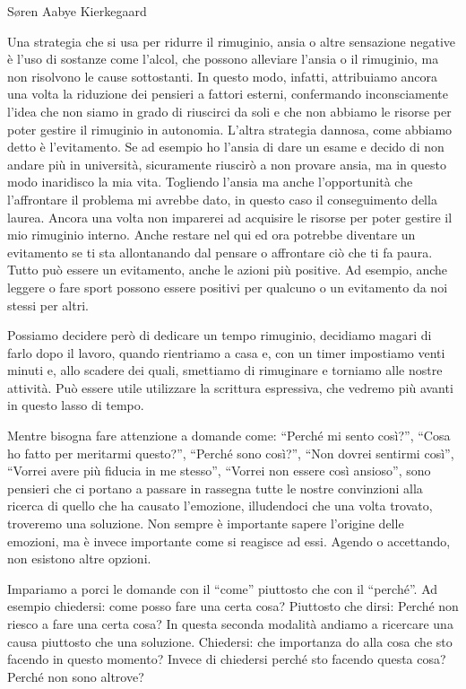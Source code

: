 \documentclass[12pt]{book} %
\begin{document}
Søren Aabye Kierkegaard

Una strategia che si usa per ridurre il rimuginio, ansia o altre sensazione negative è l'uso di sostanze come l'alcol,
che possono alleviare l’ansia o il rimuginio, ma non risolvono le cause sottostanti.
In questo modo, infatti, attribuiamo ancora una volta la riduzione dei pensieri a fattori esterni, confermando
inconsciamente l'idea che non siamo in grado di riuscirci da soli e che non abbiamo le risorse per
poter gestire il rimuginio in autonomia. L'altra strategia dannosa, come abbiamo detto è
l'evitamento. Se ad esempio ho l'ansia di dare un esame e decido di non
andare più in università, sicuramente riuscirò a non provare ansia, ma in questo modo inaridisco la mia vita. Togliendo
l'ansia ma anche l'opportunità che l'affrontare il problema mi avrebbe dato, in questo caso il conseguimento della
laurea. Ancora una volta non imparerei ad acquisire le risorse per poter gestire il mio rimuginio interno.
Anche restare nel qui ed ora potrebbe diventare un evitamento se ti sta allontanando dal pensare o affrontare ciò che ti fa paura. 
Tutto può essere un evitamento, anche le azioni più positive. Ad esempio, anche leggere o fare sport possono essere positivi per qualcuno o un evitamento da noi stessi per altri.

Possiamo decidere però di dedicare un tempo rimuginio, decidiamo magari di farlo dopo il lavoro, quando rientriamo a
casa e, con un timer impostiamo venti minuti e, allo scadere dei quali, smettiamo di rimuginare e torniamo alle nostre
attività. Può essere utile utilizzare la scrittura espressiva, che vedremo più avanti in questo lasso di tempo.

Mentre bisogna fare attenzione a domande come: “Perché mi sento così?”, “Cosa ho fatto per meritarmi questo?”, “Perché
sono così?”, “Non dovrei sentirmi così”, “Vorrei avere più fiducia in me stesso”, “Vorrei non essere così ansioso”,
sono pensieri che ci portano a passare in rassegna tutte le nostre convinzioni alla ricerca di quello che ha causato
l'emozione, illudendoci che una volta trovato, troveremo una soluzione. Non sempre è importante
sapere l'origine delle emozioni, ma è invece importante come si reagisce ad essi. Agendo o
accettando, non esistono altre opzioni.

Impariamo a porci le domande con il “come” piuttosto che con il “perché”. Ad esempio chiedersi: come posso fare una
certa cosa? Piuttosto che dirsi: Perché non riesco a fare una certa cosa? In questa seconda modalità andiamo a
ricercare una causa piuttosto che una soluzione. Chiedersi: che importanza do alla cosa che sto facendo in questo momento?
Invece di chiedersi perché sto facendo questa cosa? Perché non sono altrove? 
\end{document}
